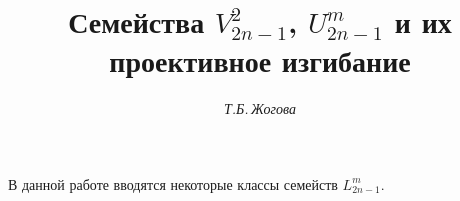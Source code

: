 

 


% 


\newcommand{\tts}[1]{} 


 




\setcounter{page}{75} 












 


\author{\it Т.Б.\,Жогова} 




\title{Семейства $V^2_{2n-1}$, $U^m_{2n-1}$ и их проективное изгибание} 


 


\date{} 




\pagestyle{plain} %


 




\maketitle 


\label{begin} 


 


 


В данной работе вводятся некоторые классы семейств $L^m_{2n-1}$. 


